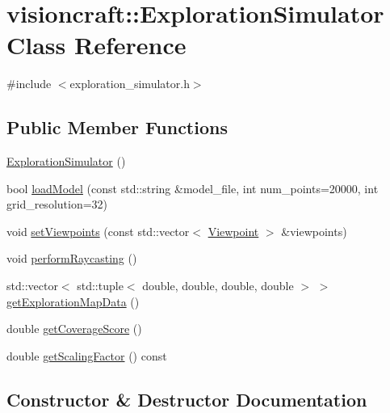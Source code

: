 \hypertarget{classvisioncraft_1_1ExplorationSimulator}{}\section{visioncraft\+:\+:Exploration\+Simulator Class Reference}
\label{classvisioncraft_1_1ExplorationSimulator}


{\ttfamily \#include $<$exploration\+\_\+simulator.\+h$>$}

\subsection*{Public Member Functions}
\begin{DoxyCompactItemize}
\item 
\hyperlink{classvisioncraft_1_1ExplorationSimulator_a17497ae22175b0c56da5e47e9c1b841e}{Exploration\+Simulator} ()
\item 
bool \hyperlink{classvisioncraft_1_1ExplorationSimulator_aff4d345d61125096d7e1bcdd69a39a20}{load\+Model} (const std\+::string \&model\+\_\+file, int num\+\_\+points=20000, int grid\+\_\+resolution=32)
\item 
void \hyperlink{classvisioncraft_1_1ExplorationSimulator_a9ea722d4f4f841df0daf6b3dd65229f2}{set\+Viewpoints} (const std\+::vector$<$ \hyperlink{classvisioncraft_1_1Viewpoint}{Viewpoint} $>$ \&viewpoints)
\item 
void \hyperlink{classvisioncraft_1_1ExplorationSimulator_af115b547cbb19fb9ba305d18b740b0a2}{perform\+Raycasting} ()
\item 
std\+::vector$<$ std\+::tuple$<$ double, double, double, double $>$ $>$ \hyperlink{classvisioncraft_1_1ExplorationSimulator_a2f1812483e24e0c27454e6016cd3808d}{get\+Exploration\+Map\+Data} ()
\item 
double \hyperlink{classvisioncraft_1_1ExplorationSimulator_a7a31a8a2ac789b2b5675c3c90bfd52c5}{get\+Coverage\+Score} ()
\item 
double \hyperlink{classvisioncraft_1_1ExplorationSimulator_afca04754c1e6b8a2feb9e7477fe66ce5}{get\+Scaling\+Factor} () const
\end{DoxyCompactItemize}


\subsection{Constructor \& Destructor Documentation}
\mbox{\label{classvisioncraft_1_1ExplorationSimulator_a17497ae22175b0c56da5e47e9c1b841e}} 
